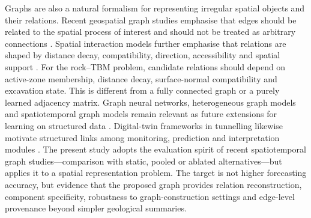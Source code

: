 Graphs are also a natural formalism for representing irregular spatial objects and their relations. Recent geospatial graph studies emphasise that edges should be related to the spatial process of interest and should not be treated as arbitrary connections \citep{zhu2020spatial,desabbata2023graph,liu2025urban,chen2026usgt}. Spatial interaction models further emphasise that relations are shaped by distance decay, compatibility, direction, accessibility and spatial support \citep{wilson1971spatial,fotheringham1989spatial}. For the rock--TBM problem, candidate relations should depend on active-zone membership, distance decay, surface-normal compatibility and excavation state. This is different from a fully connected graph or a purely learned adjacency matrix. Graph neural networks, heterogeneous graph models and spatiotemporal graph models remain relevant as future extensions for learning on structured data \citep{schlichtkrull2018modeling,zhang2019heterogeneous,wu2020comprehensive,zhou2020graph,li2018diffusion,wu2019graph,zhang2020deep,geng2019spatiotemporal,sanchez2020learning,pfaff2021learning}. Digital-twin frameworks in tunnelling likewise motivate structured links among monitoring, prediction and interpretation modules \citep{latif2023digital,apoji2023shaping,hu2025dataknowledge}. The present study adopts the evaluation spirit of recent spatiotemporal graph studies---comparison with static, pooled or ablated alternatives---but applies it to a spatial representation problem. The target is not higher forecasting accuracy, but evidence that the proposed graph provides relation reconstruction, component specificity, robustness to graph-construction settings and edge-level provenance beyond simpler geological summaries.

